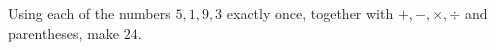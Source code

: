 Using each of the numbers $5,1,9,3$ exactly once, together with $+,-,\times,\div$ and parentheses, make $24$.
